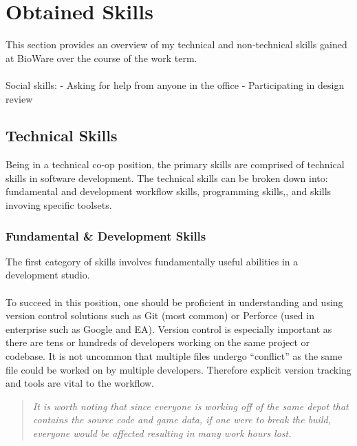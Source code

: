 \documentclass[10pt,letterpaper]{article}
\begin{document}
\section{Obtained Skills}\label{obtained-skills}

This section provides an overview of my technical and non-technical skills gained at BioWare over the course of the work term. \\
\\
Social skills:
- Asking for help from anyone in the office
- Participating in design review


\subsection{Technical Skills}

Being in a technical co-op position, the primary skills are comprised of technical skills in software development. The technical skills can be broken down into: fundamental and development workflow skills, programming skills,, and skills invoving specific toolsets.\\

\subsubsection{Fundamental \& Development Skills}

The first category of skills involves fundamentally useful abilities in a development studio.\\
\\
To succeed in this position, one should be proficient in understanding and using version control solutions such as Git (most common) or Perforce (used in enterprise such as Google and EA). Version control is especially important as there are tens or hundreds of developers working on the same project or codebase. It is not uncommon that multiple files undergo ``conflict'' as the same file could be worked on by multiple developers. Therefore explicit version tracking and tools are vital to the workflow.\\
\begin{quote}
	\textit{
It is worth noting that since everyone is working off of the same depot that contains the source code and game data, if one were to break the build, everyone would be affected resulting in many work hours lost.
	}
\end{quote}
\end{document}
